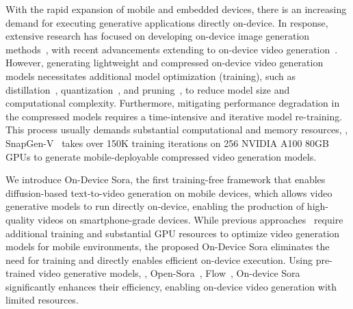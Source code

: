 
With the rapid expansion of mobile and embedded devices, there is an increasing demand for executing generative applications directly on-device. In response, extensive research has focused on developing on-device image generation methods~\cite{li2024snapfusion, vasu2023mobileone, castells2024edgefusion, choi2023squeezing, chen2023speed, zhao2023mobilediffusion}, with recent advancements extending to on-device video generation~\cite{yahia2024mobile, wu2024snapgen}. However, generating lightweight and compressed on-device video generation models necessitates additional model optimization (training), such as distillation~\cite{10.1145/3681758.3698013, lin2024animatediff, singer2024video}, quantization~\cite{tian2024qvd, zhao2024vidit}, and pruning~\cite{wu2024individual}, to reduce model size and computational complexity. Furthermore, mitigating performance degradation in the compressed models requires a time-intensive and iterative model re-training. This process usually demands substantial computational and memory resources, \eg, SnapGen-V~\cite{wu2024snapgen} takes over 150K training iterations on 256 NVIDIA A100 80GB GPUs to generate mobile-deployable compressed video generation models.

We introduce On-Device Sora, the first training-free framework that enables diffusion-based text-to-video generation on mobile devices, which allows video generative models to run directly on-device, enabling the production of high-quality videos on smartphone-grade devices. While previous approaches~\cite{wu2024snapgen} require additional training and substantial GPU resources to optimize video generation models for mobile environments, the proposed On-Device Sora eliminates the need for training and directly enables efficient on-device execution. Using pre-trained video generative models, \eg, Open-Sora~\cite{opensora},  Flow~\cite{jin2024pyramidal}, On-device Sora significantly enhances their efficiency, enabling on-device video generation with limited resources. 

